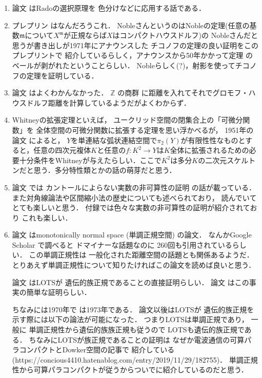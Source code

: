 \documentclass[leqno, a4paper, 12pt]{jsarticle}
\newcommand{\zz}{\mathbb{Z}}
\begin{document}
\begin{enumerate}[label=(\arabic*)]
\item 
論文
\cite{MR1171783}
はRadoの選択原理を
色分けなどに応用する話である．



\item 
プレプリン
\cite{noble2021yet}
はなんだろうこれ．
NobleさんというのはNobleの定理(任意の基数$\mathfrak{m}$について$X^{\mathfrak{m}}$が正規ならば$X$はコンパクトハウスドルフ)の
Nobleさんだと思うが書き出しが1971年にアナウンスした
チコノフの定理の良い証明をこのプレプリントで
紹介しているらしく，アナウンスから50年かかって定理
のベールが剥がれたということらしい．
Nobleらしく(?)，射影を使ってチコノフの定理を証明している．



\item 
論文
\cite{torrome2020quotient}
はよくわかんなかった．
$\zz$
の商群
に距離を入れてそれでグロモフ・ハウスドルフ距離を計算しているようだがよくわからず．


\item 
Whitneyの拡張定理といえば，
ユークリッド空間の閉集合上の「可微分関数」を
全体空間の可微分関数に拡張する定理を思い浮かべるが，
1951年の論文\cite{nakaoka1951whitney}
によると，
$Y$を単連結な弧状連結空間で$\pi_{2}(Y)$が有限性性なものとすると，任意の四次元複体$K$と任意の$f\colon K^{2}\to Y$は$K$全体に拡張されるための必要十分条件をWhitneyが与えたらしい．ここで$K^{2}$は多分$K$の二次元スケルトンだと思う．多分特性類とかの話の萌芽だと思う．


\item 
論文
\cite{wa1}
では
カントールによらない実数の非可算性の証明
の話が載っている．
また対角線論法や区間縮小法の歴史についても述べられており，
読んでいてとても楽しいと思う．
付録では色々な実数の非可算性の証明が紹介されており
これも楽しい．



\item 
論文
\cite{heath1973monotonically}
はmonotonically normal space
(単調正規空間)
の論文．
なんかGoogle Scholar で調べると
ドマイナーな話題なのに
260回も引用されているらしい．
この単調正規性は
一般化された距離空間の話題とも関係あるようだ．
とりあえず単調正規性について知りたければこの論文を読めば良いと思う．


論文
\cite{steen1970direct}
はLOTSが
遺伝的族正規であることの直接証明らしい．
論文
\cite{cater2006simple}
はこの事実の簡単な証明らしい．



ちなみに\cite{steen1970direct}は1970年で
\cite{heath1973monotonically}は1973年である．
論文\cite{heath1973monotonically}以後はLOTSが
遺伝的族正規を示す際には以下の論法が可能になった．
つまりLOTSは単調正規であり，
一般に
単調正規性から遺伝的族族正規も従うので
LOTSも遺伝的族正規である．
ちなみにLOTSが族正規であることの証明は
なぜか電波通信の可算パラコンパクトとDowker空間の記事で
紹介している(https://concious4410.hatenablog.com/entry/2019/11/29/182755)．
単調正規性から可算パラコンパクトが従うからついでに紹介しているのだと思う．


\end{enumerate}
\end{document}
